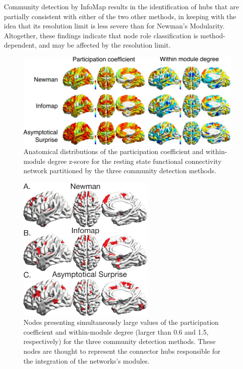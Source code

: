 Community detection by InfoMap results in the identification of hubs that are partially consistent with either of the two other methods, in keeping with the idea that its resolution limit is less severe than for Newman's Modularity.
Altogether, these findings indicate that node role classification is method-dependent, and may be affected by the resolution limit.

\begin{figure}[!htb]
\includegraphics[width=\textwidth]{images/pacopaperfigure8.pdf}
\caption{Anatomical distributions of the participation coefficient and within-module degree z-score for the resting state functional connectivity network partitioned by the three community detection methods.}
\label{fig:hubclassification}
\end{figure}
\begin{figure}[!htb]
\includegraphics[width=0.6\textwidth]{images/pacopaperfigure9.pdf}
\caption{Nodes presenting simultaneously large values of the participation coefficient and within-module degree (larger than 0.6 and 1.5, respectively) for the three community detection methods. These nodes are thought to represent the connector hubs responsible for the integration of the networks's modules.
}
\label{fig:hubclassification_threshold}
\end{figure}

